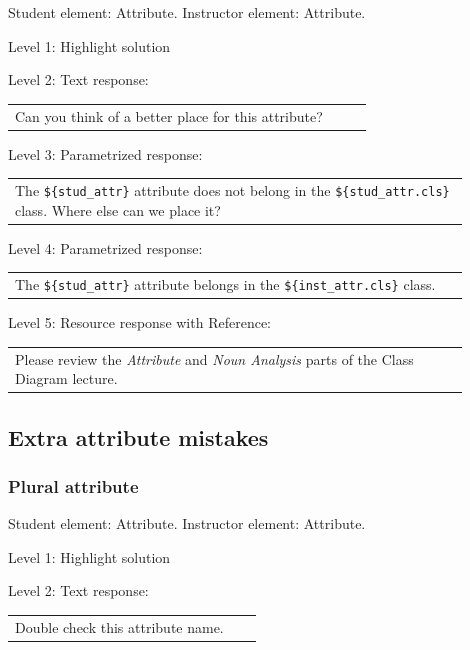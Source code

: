 Student element: Attribute. Instructor element: Attribute. \medskip

\noindent Level 1: Highlight solution  \medskip

\noindent Level 2: Text response: \medskip

\begin{tabular}{|p{0.9\linewidth}}
Can you think of a better place for this attribute?
\end{tabular} \medskip

\noindent Level 3: Parametrized response: \medskip

\begin{tabular}{|p{0.9\linewidth}}
The \verb|${stud_attr}| attribute does not belong in the \verb|${stud_attr.cls}| class. Where else can we place it?
\end{tabular} \medskip

\noindent Level 4: Parametrized response: \medskip

\begin{tabular}{|p{0.9\linewidth}}
The \verb|${stud_attr}| attribute belongs in the \verb|${inst_attr.cls}| class.
\end{tabular} \medskip

\noindent Level 5: Resource response with Reference: \medskip

\begin{tabular}{|p{0.9\linewidth}}
Please review the \textit{Attribute} and \textit{Noun Analysis} parts of the Class Diagram lecture.
\end{tabular} \medskip


\subsection{Extra attribute mistakes}

\subsubsection{Plural attribute}

Student element: Attribute. Instructor element: Attribute. \medskip

\noindent Level 1: Highlight solution  \medskip

\noindent Level 2: Text response: \medskip

\begin{tabular}{|p{0.9\linewidth}}
Double check this attribute name.
\end{tabular} \medskip

